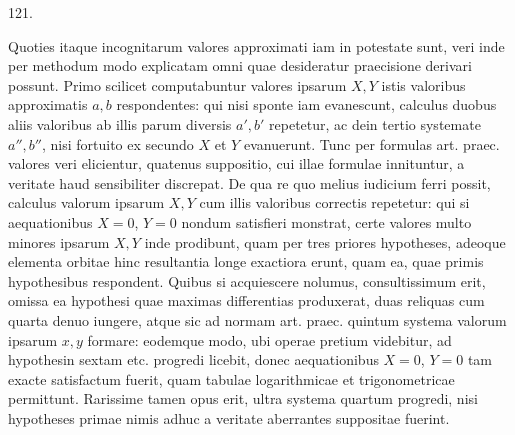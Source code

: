 \par{}\medskip
\begin{center}\hypertarget{native-168-article121}{}121.\end{center}
Quoties itaque incognitarum valores approximati iam in potestate sunt,
veri inde per methodum modo explicatam omni quae desideratur praecisione
derivari possunt. Primo scilicet computabuntur valores ipsarum $X,Y$ istis
valoribus approximatis $a,b$ respondentes: qui nisi sponte iam evanescunt,
calculus duobus aliis valoribus ab illis parum diversis $a',b'$ repetetur, ac dein
tertio systemate $a'',b''$, nisi fortuito ex secundo $X$ et $Y$ evanuerunt. Tunc
per formulas art. praec. valores veri elicientur, quatenus suppositio, cui illae
formulae innituntur, a veritate haud sensibiliter discrepat. De qua re quo
melius iudicium ferri possit, calculus valorum ipsarum $X,Y$ cum illis valoribus
correctis repetetur: qui si aequationibus $X=0$, $Y=0$ nondum satisfieri
monstrat, certe valores multo minores ipsarum $X,Y$ inde prodibunt, quam
per tres priores hypotheses, adeoque elementa orbitae hinc resultantia longe
exactiora erunt, quam ea, quae primis hypothesibus respondent. Quibus si
acquiescere nolumus, consultissimum erit, omissa ea hypothesi quae maximas
differentias produxerat, duas reliquas cum quarta denuo iungere, atque sic ad
normam art. praec. quintum systema valorum ipsarum $x,y$ formare: eodemque
modo, ubi operae pretium videbitur, ad hypothesin sextam etc. progredi
licebit, donec aequationibus $X=0$, $Y=0$ tam exacte satisfactum fuerit,
quam tabulae logarithmicae et trigonometricae permittunt. Rarissime tamen
opus erit, ultra systema quartum progredi, nisi hypotheses primae nimis adhuc a veritate aberrantes suppositae fuerint.
